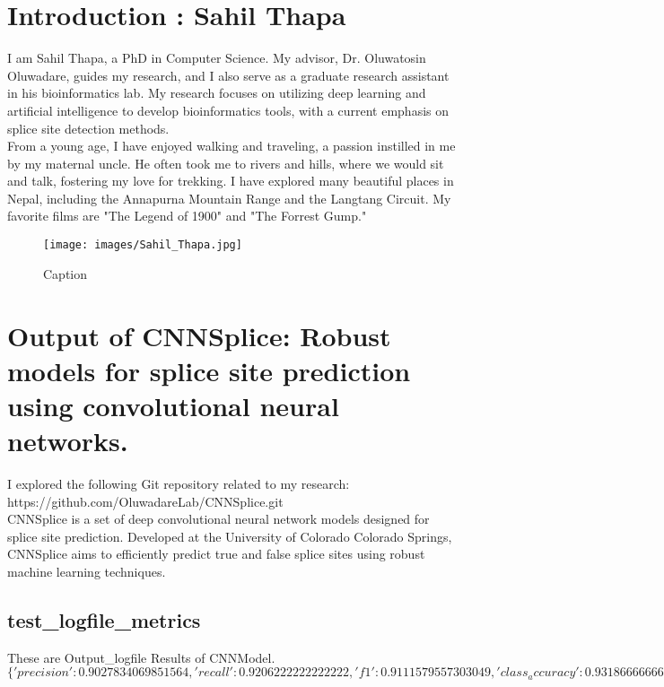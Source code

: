 

\section{Introduction : Sahil Thapa}
I am Sahil Thapa, a PhD in Computer Science. My advisor, Dr. Oluwatosin Oluwadare, guides my research, and I also serve as a graduate research assistant in his bioinformatics lab. My research focuses on utilizing deep learning and artificial intelligence to develop bioinformatics tools, with a current emphasis on splice site detection methods.\\

From a young age, I have enjoyed walking and traveling, a passion instilled in me by my maternal uncle. He often took me to rivers and hills, where we would sit and talk, fostering my love for trekking. I have explored many beautiful places in Nepal, including the Annapurna Mountain Range and the Langtang Circuit. My favorite films are "The Legend of 1900" and "The Forrest Gump."

\begin{figure}[h!]
    \centering
    \texttt{[image: images/Sahil\_Thapa.jpg]}
    \caption{Caption}
    \label{fig:enter-label}
\end{figure}

\section{Output of CNNSplice: Robust models for splice site prediction using convolutional neural networks.}
I explored the following Git repository related to my research: https://github.com/OluwadareLab/CNNSplice.git\\

CNNSplice is a set of deep convolutional neural network models designed for splice site prediction. Developed at the University of Colorado Colorado Springs, CNNSplice aims to efficiently predict true and false splice sites using robust machine learning techniques.

\subsection{test\_logfile\_metrics}
These are Output\_logfile Results of CNNModel.\\
$\{'precision': 0.9027834069851564, 'recall': 0.9206222222222222, 'f1': 0.9111579557303049, 'class_accuracy': 0.9318666666666666, 'accuracy': 0.9318666458129883\}$\\

